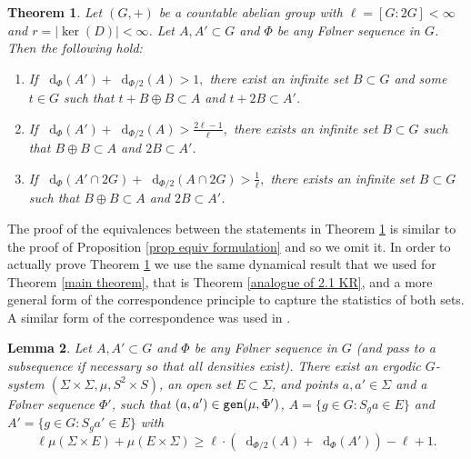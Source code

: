 \documentclass[reqno]{amsart}
\newcommand*\diff{\mathop{}\!\mathrm{d}}
\newtheorem{theorem}{Theorem}[section]
\newtheorem{lemma}[theorem]{Lemma}
\theoremstyle{definition}
\theoremstyle{remark}
\theoremstyle{remark}
\newcommand{\gen}{\texttt{\textup{gen}}}
\newcommand{\Folner}{F\o{}lner}
\begin{document}
\begin{theorem}\label{main theorem strong}
Let $(G,+)$ be a countable abelian group with $\ell=[G:2G]<\infty$ and $r=|\ker(D)|<\infty$. Let $A,A'\subset G$ and $\Phi$ be any \Folner{} sequence in $G$. Then the following hold:
\begin{enumerate}
\item  \label{main_theorem_1_2_strong}
If 
$\diff_\Phi(A')+ \diff_{\Phi/2}(A)> 1,$
there exist an infinite set $B\subset G$ and some $t\in G$ such that 
$t+B\oplus B\subset A$ and $t+2B\subset A'$. 
\item  \label{main_theorem_1_1_strong} 
\vspace{2mm} 
If 
$\diff_\Phi(A') + \diff_{\Phi/2}(A)> \frac{2\ell-1}{\ell},$
there exists an infinite set $B\subset G$ such that $B\oplus B\subset A$ and $2B\subset A'$. 
\item   \label{main_theorem_evens_strong}  \vspace{2mm} If 
$ \diff_\Phi(A'\cap 2G)+\diff_{\Phi/2}(A\cap 2G) > \frac{1}{\ell},$
there exists an infinite set $B\subset G$ such that $B\oplus B\subset A$ and $2B\subset A'$.
\end{enumerate}    
\end{theorem}   

The proof of the equivalences between the statements in 
Theorem \ref{main theorem strong} is similar to the proof of Proposition \ref{prop equiv formulation} and so we omit it. In 
order to actually prove Theorem \ref{main theorem strong} we 
use the same dynamical result that we used for Theorem 
\ref{main theorem}, that is Theorem \ref{analogue of 2.1 KR}, 
and a more general form of the correspondence principle to 
capture the statistics of both sets. A similar form of the 
correspondence was used in \cite[Lemmas 2.8, 2.9]{kousek2025asymmetric}.

\begin{lemma}\label{correspondence_2}
Let $A,A'\subset G$ and $\Phi$ be any \Folner{} sequence in 
$G$ (and pass to a subsequence if necessary so that all 
densities exist). There exist an ergodic $G$-system $(\Sigma 
\times \Sigma, \mu, S^2 \times S)$, an open set $E\subset \Sigma$, and points $a,a'\in \Sigma$ and a \Folner{} sequence 
$\Phi'$, such that $(a,a')\in \gen(\mu,\Phi')$, $A=\{g\in G\colon S_g a \in E\}$ and $A'=\{g\in G\colon S_{g} a' \in E\}$ with
\begin{equation}\label{dbound_no_shift}
    \ell\mu(\Sigma\times E) + \mu(E\times\Sigma) 
    \geq \ell \cdot (\diff_{\Phi/2}(A) + \diff_{\Phi}(A') ) - \ell +1.
\end{equation}
\end{lemma}
\end{document}
